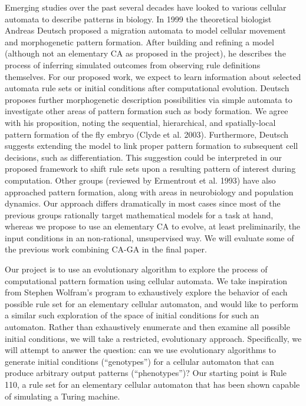 \documentclass[twocolumn]{article}
\begin{document}
Emerging studies over the past several decades have looked to various cellular automata to describe patterns in biology.  In 1999 the theoretical biologist Andreas Deutsch proposed a migration automata to model cellular movement and morphogenetic pattern formation.  After building and refining a model (although not an elementary CA as proposed in the project), he describes the process of inferring simulated outcomes from observing rule definitions themselves.  For our proposed work, we expect to learn information about selected automata rule sets or initial conditions after computational evolution.  Deutsch proposes further morphogenetic description possibilities via simple automata to investigate other areas of pattern formation such as body formation.  We agree with his proposition, noting the sequential, hierarchical, and spatially-local pattern formation of the fly embryo (Clyde et al. 2003).  Furthermore, Deutsch suggests extending the model to link proper pattern formation to subsequent cell decisions, such as differentiation.  This suggestion could be interpreted in our proposed framework to shift rule sets upon a resulting pattern of interest during computation.  Other groups (reviewed by Ermentrout et al. 1993) have also approached pattern formation, along with areas in neurobiology and population dynamics.  Our approach differs dramatically in most cases since most of the previous groups rationally target mathematical models for a task at hand, whereas we propose to use an elementary CA to evolve, at least preliminarily, the input conditions in an non-rational, unsupervised way. 
We will evaluate some of the previous work combining CA-GA in the final paper.

Our project is to use an evolutionary algorithm to explore the process of computational pattern formation using cellular automata. We take inspiration from Stephen Wolfram’s program to exhaustively explore the behavior of each possible rule set for an elementary cellular automaton, and would like to perform a similar such exploration of the space of initial conditions for such an automaton. Rather than exhaustively enumerate and then examine all possible initial conditions, we will take a restricted, evolutionary approach. Specifically, we will attempt to answer the question: can we use evolutionary algorithms to generate initial conditions (``genotypes'') for a cellular automaton that can produce arbitrary output patterns (``phenotypes'')? Our starting point is Rule 110, a rule set for an elementary cellular automaton that has been shown capable of simulating a Turing machine. 
\end{document}

